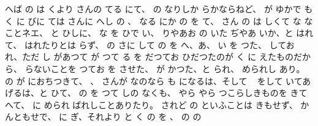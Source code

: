 へば
の
は
くより
さんの
てる
にて、
の
なりしか
らかならねど、
が
ゆかで
も
く
に
びに
ては
さんに
へし
の
、
なる
にか
の
を
て、
さん
の
は
しくて
な
なことネエ、
と
ひしに、
な
を
ひで
い、
りやあお
の
いた
ぢやあ
いか、と
はれて、
はれたりとは
らず、
の
さに
して
の
を
へ、あ、
い
を
つた、
してお
れ、ただ
し
があつて
が
つて
る
を
だつてお
ひだつたのが
く
に
えたものだから、
らないことを
つてお
を
させた、
が
かつた、と
られ、
められし
あり。
の
が
におちつきて、
、
さんが
なのなら
も
になるは、そして
\ %
をして
いてあげるは、と
ひて、
の
を
つて
しの
なくも、
やら
やら
つこらしきものを
きて
へて、
に
められ
ばれしことありたり。
されど
の
といふことは
きもせず、
かんともせで、
に
ぎ、それより
と
く
の
を
、
の
の
